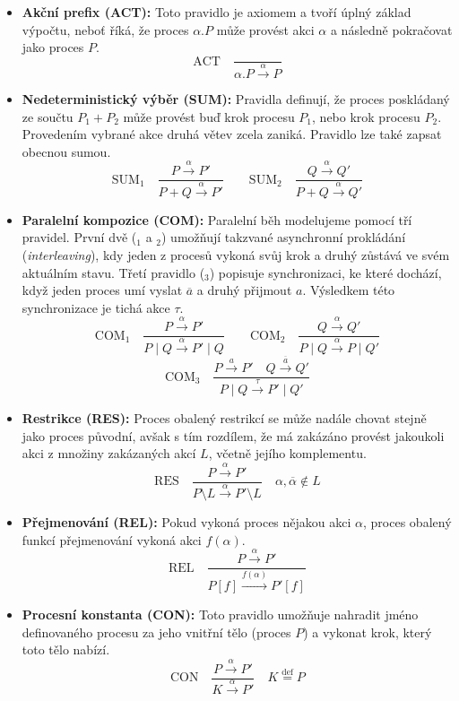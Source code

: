 \begin{itemize}
    \item \textbf{Akční prefix (ACT):} Toto pravidlo je axiomem a tvoří úplný základ výpočtu, neboť říká, že proces $\alpha.P$ může provést akci $\alpha$ a následně pokračovat jako proces $P$.
    $$ \text{ACT} \quad \frac{}{\alpha.P \xrightarrow{\alpha} P} $$

    \item \textbf{Nedeterministický výběr (SUM):} Pravidla definují, že proces poskládaný ze součtu $P_1 + P_2$ může provést buď krok procesu $P_1$, nebo krok procesu $P_2$. Provedením vybrané akce druhá větev zcela zaniká. Pravidlo lze také zapsat obecnou sumou.
    $$ \text{SUM}_1 \quad \frac{P \xrightarrow{\alpha} P'}{P + Q \xrightarrow{\alpha} P'} \qquad \text{SUM}_2 \quad \frac{Q \xrightarrow{\alpha} Q'}{P + Q \xrightarrow{\alpha} Q'} $$

    \item \textbf{Paralelní kompozice (COM):} Paralelní běh modelujeme pomocí tří pravidel. První dvě ($_1$ a $_2$) umožňují takzvané asynchronní prokládání (\textit{interleaving}), kdy jeden z procesů vykoná svůj krok a druhý zůstává ve svém aktuálním stavu. Třetí pravidlo ($_3$) popisuje synchronizaci, ke které dochází, když jeden proces umí vyslat $\overline{a}$ a druhý přijmout $a$. Výsledkem této synchronizace je tichá akce $\tau$.
    $$ \text{COM}_1 \quad \frac{P \xrightarrow{\alpha} P'}{P \mid Q \xrightarrow{\alpha} P' \mid Q} \qquad \text{COM}_2 \quad \frac{Q \xrightarrow{\alpha} Q'}{P \mid Q \xrightarrow{\alpha} P \mid Q'} $$
    $$ \text{COM}_3 \quad \frac{P \xrightarrow{a} P' \quad Q \xrightarrow{\overline{a}} Q'}{P \mid Q \xrightarrow{\tau} P' \mid Q'} $$

    \item \textbf{Restrikce (RES):} Proces obalený restrikcí se může nadále chovat stejně jako proces původní, avšak s tím rozdílem, že má zakázáno provést jakoukoli akci z množiny zakázaných akcí $L$, včetně jejího komplementu.
    $$ \text{RES} \quad \frac{P \xrightarrow{\alpha} P'}{P \setminus L \xrightarrow{\alpha} P' \setminus L} \quad \alpha, \overline{\alpha} \notin L $$

    \item \textbf{Přejmenování (REL):} Pokud vykoná proces nějakou akci $\alpha$, proces obalený funkcí přejmenování vykoná akci $f(\alpha)$.
    $$ \text{REL} \quad \frac{P \xrightarrow{\alpha} P'}{P[f] \xrightarrow{f(\alpha)} P'[f]} $$

    \item \textbf{Procesní konstanta (CON):} Toto pravidlo umožňuje nahradit jméno definovaného procesu za jeho vnitřní tělo (proces $P$) a vykonat krok, který toto tělo nabízí.
    $$ \text{CON} \quad \frac{P \xrightarrow{\alpha} P'}{K \xrightarrow{\alpha} P'} \quad K \stackrel{\text{def}}{=} P $$
\end{itemize}

